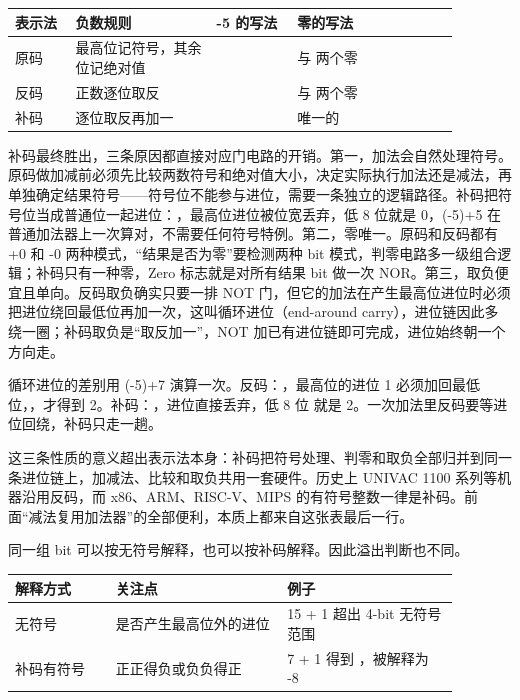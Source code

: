 \begin{longtable}{L{0.12\linewidth}L{0.28\linewidth}L{0.16\linewidth}L{0.32\linewidth}}
\toprule
表示法 & 负数规则 & -5 的写法 & 零的写法 \\
\midrule
原码 & 最高位记符号，其余位记绝对值 &  &  与  两个零 \\
反码 & 正数逐位取反 &  &  与  两个零 \\
补码 & 逐位取反再加一 &  & 唯一的  \\
\bottomrule
\end{longtable}

补码最终胜出，三条原因都直接对应门电路的开销。第一，加法会自然处理符号。原码做加减前必须先比较两数符号和绝对值大小，决定实际执行加法还是减法，再单独确定结果符号——符号位不能参与进位，需要一条独立的逻辑路径。补码把符号位当成普通位一起进位：，最高位进位被位宽丢弃，低 8 位就是 0，(-5)+5 在普通加法器上一次算对，不需要任何符号特例。第二，零唯一。原码和反码都有 +0 和 -0 两种模式，“结果是否为零”要检测两种 bit 模式，判零电路多一级组合逻辑；补码只有一种零，Zero 标志就是对所有结果 bit 做一次 NOR。第三，取负便宜且单向。反码取负确实只要一排 NOT 门，但它的加法在产生最高位进位时必须把进位绕回最低位再加一次，这叫循环进位（end-around carry），进位链因此多绕一圈；补码取负是“取反加一”，NOT 加已有进位链即可完成，进位始终朝一个方向走。

循环进位的差别用 (-5)+7 演算一次。反码：，最高位的进位 1 必须加回最低位，，才得到 2。补码：，进位直接丢弃，低 8 位  就是 2。一次加法里反码要等进位回绕，补码只走一趟。

这三条性质的意义超出表示法本身：补码把符号处理、判零和取负全部归并到同一条进位链上，加减法、比较和取负共用一套硬件。历史上 UNIVAC 1100 系列等机器沿用反码，而 x86、ARM、RISC-V、MIPS 的有符号整数一律是补码。前面“减法复用加法器”的全部便利，本质上都来自这张表最后一行。

同一组 bit 可以按无符号解释，也可以按补码解释。因此溢出判断也不同。

\begin{longtable}{L{0.2\linewidth}L{0.34\linewidth}L{0.34\linewidth}}
\toprule
解释方式 & 关注点 & 例子 \\
\midrule
无符号 & 是否产生最高位外的进位 & 15 + 1 超出 4-bit 无符号范围 \\
补码有符号 & 正正得负或负负得正 & 7 + 1 得到 ，被解释为 -8 \\
\bottomrule
\end{longtable}

